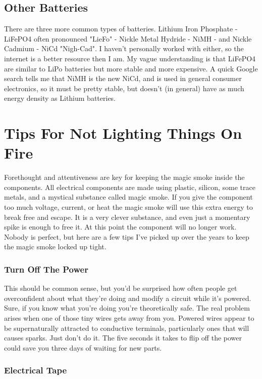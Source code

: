 \subsection{Other Batteries}

There are three more common types of batteries. Lithium Iron Phosphate - LiFePO4 often pronounced "LieFo" - Nickle Metal Hydride - NiMH - and Nickle Cadmium - NiCd "Nigh-Cad". I haven't personally worked with either, so the internet is a better resource then I am. My vague understanding is that LiFePO4 are similar to LiPo batteries but more stable and more expensive. A quick Google search tells me that NiMH is the new NiCd, and is used in general consumer electronics, so it must be pretty stable, but doesn't (in general) have as much energy density as Lithium batteries.

\section{Tips For Not Lighting Things On Fire}

Forethought and attentiveness are key for keeping the magic smoke inside the components. All electrical components are made using plastic, silicon, some trace metals, and a mystical substance called magic smoke. If you give the component too much voltage, current, or heat the magic smoke will use this extra energy to break free and escape. It is a very clever substance, and even just a momentary spike is enough to free it. At this point the component will no longer work. Nobody is perfect, but here are a few tips I've picked up over the years to keep the magic smoke locked up tight.

\subsubsection{Turn Off The Power}

This should be common sense, but you'd be surprised how often people get overconfident about what they're doing and modify a circuit while it's powered. Sure, if you know what you're doing you're theoretically safe. The real problem arises when one of those tiny wires gets away from you. Powered wires appear to be supernaturally attracted to conductive terminals, particularly ones that will causes sparks. Just don't do it. The five seconds it takes to flip off the power could save you three days of waiting for new parts.

\subsubsection{Electrical Tape}

